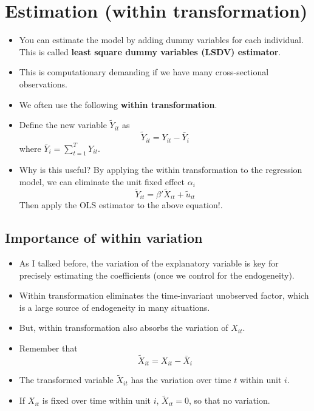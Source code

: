 \documentclass[]{book}
\providecommand{\tightlist}{%
  \setlength{\itemsep}{0pt}\setlength{\parskip}{0pt}}
\begin{document}
\section{Estimation (within
transformation)}\label{estimation-within-transformation}

\begin{itemize}
\tightlist
\item
  You can estimate the model by adding dummy variables for each
  individual. This is called \textbf{least square dummy variables (LSDV)
  estimator}.
\item
  This is computationary demanding if we have many cross-sectional
  observations.
\item
  We often use the following \textbf{within transformation}.
\item
  Define the new variable \(\tilde{Y}_{it}\) as \[
  \tilde{Y}_{it} = Y_{it} - \bar{Y}_i
  \] where \(\bar{Y}_i = \sum_{t=1}^T Y_{it}\).
\item
  Why is this useful? By applying the within transformation to the
  regression model, we can eliminate the unit fixed effect \(\alpha_i\)
  \[
  \tilde{Y}_{it} = \beta' \tilde{X}_{it} + \tilde{u}_{it}
  \] Then apply the OLS estimator to the above equation!.
\end{itemize}

\subsection{Importance of within
variation}\label{importance-of-within-variation}

\begin{itemize}
\tightlist
\item
  As I talked before, the variation of the explanatory variable is key
  for precisely estimating the coefficients (once we control for the
  endogeneity).
\item
  Within transformation eliminates the time-invariant unobserved factor,
  which is a large source of endogeneity in many situations.
\item
  But, within transformation also absorbs the variation of \(X_{it}\).
\item
  Remember that \[
  \tilde{X}_{it} = X_{it} - \bar{X}_i
  \]
\item
  The transformed variable \(\tilde{X}_{it}\) has the variation over
  time \(t\) within unit \(i\).
\item
  If \(X_{it}\) is fixed over time within unit \(i\),
  \(\tilde{X}_{it} = 0\), so that no variation.
\end{itemize}
\end{document}
